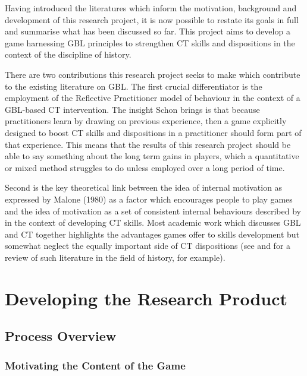 \documentclass{l4proj}
\begin{document}
Having introduced the literatures which inform the motivation, background and development of this research project, it is now possible to restate its goals in full and summarise what has been discussed so far. This project aims to develop a game harnessing GBL principles to strengthen CT skills and dispositions in the context of the discipline of history. 

There are two contributions this research project seeks to make which contribute to the existing literature on GBL. The first crucial differentiator is the employment of the Reflective Practitioner model of behaviour in the context of a GBL-based CT intervention. The insight Schon brings is that because practitioners learn by drawing on previous experience, then a game explicitly designed to boost CT skills and dispositions in a practitioner should form part of that experience. This means that the results of this research project should be able to say something about the long term gains in players, which a quantitative or mixed method struggles to do unless employed over a long period of time. 

Second is the key theoretical link between the idea of internal motivation as expressed by Malone (1980) as a factor which encourages people to play games and the idea of motivation as a set of consistent internal behaviours described by \citet{facione2000CT} in the context of developing CT skills. Most academic work which discusses GBL and CT together highlights the advantages games offer to skills development but somewhat neglect the equally important side of CT dispositions (see \citet{mccall2013gaming} and \citet{mccall2016teaching} for a review of such literature in the field of history, for example). 

\chapter{Developing the Research Product}
\section{Process Overview}
\subsection{Motivating the Content of the Game}
\end{document}
